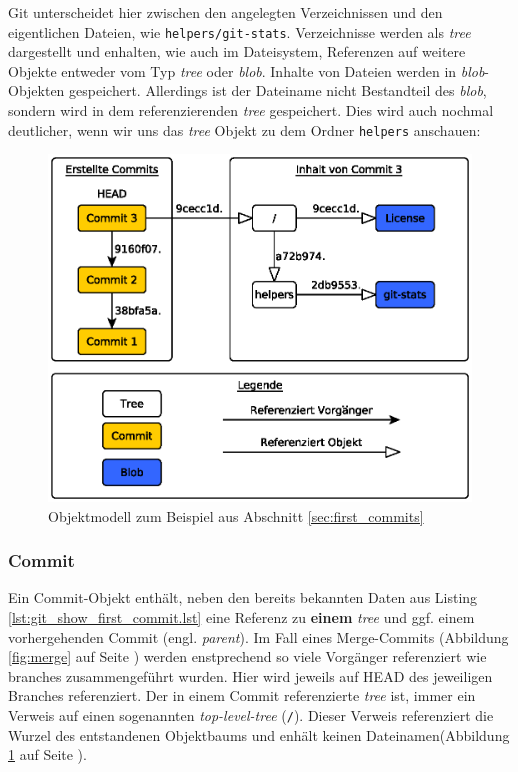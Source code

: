 

Git unterscheidet hier zwischen den angelegten Verzeichnissen und den
eigentlichen Dateien, wie \texttt{helpers/git-stats}. Verzeichnisse werden als
\textit{tree} dargestellt und enhalten, wie auch im Dateisystem, Referenzen auf
weitere Objekte entweder vom Typ \textit{tree} oder \textit{blob}.  Inhalte von
Dateien werden in \textit{blob}-Objekten gespeichert. Allerdings ist der
Dateiname nicht Bestandteil des \textit{blob}, sondern wird in dem
referenzierenden \textit{tree} gespeichert. Dies wird auch nochmal deutlicher,
wenn wir uns das \textit{tree} Objekt zu dem Ordner \texttt{helpers} anschauen:



\begin{figure}[h]
  \centering
  \includegraphics[scale=0.75]{images/objectmodel.eps}
  \caption{Objektmodell zum Beispiel aus Abschnitt \ref{sec:first_commits}\cite[S.~53]{gitosp}}
  \label{fig:objectmodel}
\end{figure}

\subsubsection{Commit}\label{sec:commitobject}
Ein Commit-Objekt enthält, neben den bereits bekannten Daten aus Listing
\ref{lst:git_show_first_commit.lst} eine Referenz zu \textbf{einem}
\textit{tree} und ggf. einem vorhergehenden Commit (engl.  \textit{parent}). Im Fall
eines Merge-Commits (Abbildung \ref{fig:merge} auf Seite \pageref{fig:merge})
werden enstprechend so viele Vorgänger referenziert wie branches
zusammengeführt wurden. Hier wird jeweils auf \gls{HEAD} des jeweiligen
Branches referenziert. Der in einem Commit referenzierte \textit{tree} ist,
immer ein Verweis auf einen sogenannten \textit{top-level-tree} (\texttt{/}).
Dieser Verweis referenziert die Wurzel des entstandenen Objektbaums und enhält
keinen Dateinamen(Abbildung \ref{fig:objectmodel} auf Seite \pageref{fig:objectmodel}).

